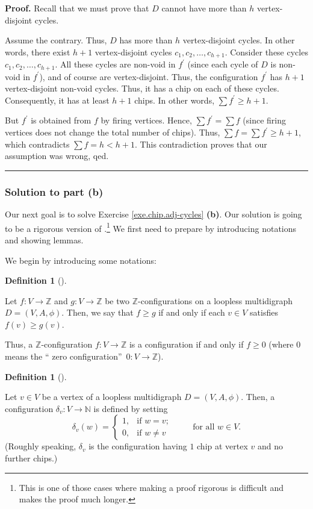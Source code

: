 \documentclass[numbers=enddot,12pt,final,onecolumn,notitlepage]{scrartcl}%
\theoremstyle{definition}
\newtheorem{defi}[theo]{Definition}
\newenvironment{definition}[1][]
{\begin{defi}[#1]\begin{leftbar}}
{\end{leftbar}\end{defi}}
\newenvironment{proof}[1][Proof]{\noindent\textbf{#1.} }{\ \rule{0.5em}{0.5em}}
\let\sumnonlimits\sum
\renewcommand{\sum}{\sumnonlimits\limits}
\begin{document}
\begin{proof}
Recall that we must prove that $D$ cannot have more than $h$
vertex-disjoint cycles.

Assume the contrary. Thus, $D$ has more than $h$ vertex-disjoint cycles. In
other words, there exist $h+1$ vertex-disjoint cycles $c_{1},c_{2}%
,\ldots,c_{h+1}$. Consider these cycles $c_{1},c_{2},\ldots,c_{h+1}$. All
these cycles are non-void in $f^{\prime}$ (since each cycle of $D$ is non-void
in $f^{\prime}$), and of course are vertex-disjoint. Thus, the configuration
$f^{\prime}$ has $h+1$ vertex-disjoint non-void cycles. Thus, it has a chip on
each of these cycles. Consequently, it has at least $h+1$ chips. In other
words, $\sum f^{\prime}\geq h+1$.

But $f^{\prime}$ is obtained from $f$ by firing vertices. Hence, $\sum
f^{\prime}=\sum f$ (since firing vertices does not change the total number of
chips). Thus, $\sum f=\sum f^{\prime}\geq h+1$, which contradicts $\sum
f=h<h+1$. This contradiction proves that our assumption was wrong, qed.
\end{proof}

\subsubsection{Solution to part \textbf{(b)}}

Our next goal is to solve Exercise \ref{exe.chip.adj-cycles} \textbf{(b)}.
Our solution is going to be a rigorous version of
\cite[proof of Theorem 2.2]{BjoLov92}.\footnote{This is one of
  those cases where
  making a proof rigorous is difficult and makes the proof
  much longer.}
We first need to prepare by introducing notations and showing lemmas.

We begin by introducing some notations:

\begin{definition}
Let $f:V\rightarrow\mathbb{Z}$ and $g:V\rightarrow\mathbb{Z}$ be two
$\mathbb{Z}$-configurations on a loopless multidigraph $D=\left(
V,A,\phi\right)  $. Then, we say that $f\geq g$ if and only if each $v\in V$
satisfies $f\left(  v\right)  \geq g\left(  v\right)  $.
\end{definition}

Thus, a $\mathbb{Z}$-configuration $f:V\rightarrow\mathbb{Z}$ is a
configuration if and only if $f\geq0$ (where $0$ means the \textquotedblleft
zero configuration\textquotedblright\ $0:V\rightarrow\mathbb{Z}$).

\begin{definition}
Let $v\in V$ be a vertex of a loopless multidigraph $D=\left(  V,A,\phi
\right)  $. Then, a configuration $\delta_{v}:V\rightarrow\mathbb{N}$ is
defined by setting
\[
\delta_{v}\left(  w\right)  =%
\begin{cases}
1, & \text{if }w=v;\\
0, & \text{if }w\neq v
\end{cases}
\qquad\text{ for all }w\in V.
\]
(Roughly speaking, $\delta_{v}$ is the configuration having $1$ chip at vertex
$v$ and no further chips.)
\end{definition}
\end{document}
